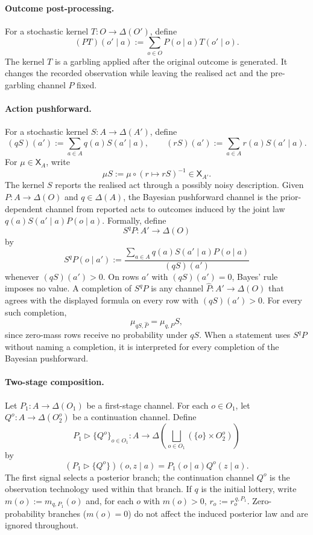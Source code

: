 \documentclass[11pt,a4paper]{article}
\theoremstyle{definition}
\newcommand{\1}{\mathbf 1}
\begin{document}
\paragraph{Outcome post-processing.}
For a stochastic kernel $T:O\to\Delta(O')$, define
\[
(PT)(o'\mid a):=\sum_{o\in O}P(o\mid a)T(o'\mid o).
\]
The kernel $T$ is a garbling applied after the original outcome is generated.  It changes the recorded observation while
leaving the realised act and the pre-garbling channel $P$ fixed.

\paragraph{Action pushforward.}
For a stochastic kernel $S:A\to\Delta(A')$, define
\[
(qS)(a'):=\sum_{a\in A}q(a)S(a'\mid a),
\qquad
(rS)(a'):=\sum_{a\in A}r(a)S(a'\mid a).
\]
For $\mu\in\mathsf X_A$, write
\[
\mu S:=\mu\circ(r\mapsto rS)^{-1}\in\mathsf X_{A'}.
\]
The kernel $S$ reports the realised act through a possibly noisy description.  Given $P:A\to\Delta(O)$ and
$q\in\Delta(A)$, the Bayesian pushforward channel is the prior-dependent channel from reported acts to outcomes induced by
the joint law $q(a)S(a'\mid a)P(o\mid a)$.  Formally, define
\[
S^qP:A'\to\Delta(O)
\]
by
\[
S^qP(o\mid a')
:=
\frac{\sum_{a\in A}q(a)S(a'\mid a)P(o\mid a)}{(qS)(a')}
\]
whenever $(qS)(a')>0$.  On rows $a'$ with $(qS)(a')=0$, Bayes' rule imposes no value.  A completion of
$S^qP$ is any channel $\widehat P:A'\to\Delta(O)$ that agrees with the displayed formula on every row with
$(qS)(a')>0$.  For every such completion,
\[
\mu_{qS,\widehat P}=\mu_{q,P}S,
\]
since zero-mass rows receive no probability under $qS$.  When a statement uses $S^qP$ without naming a completion, it is
interpreted for every completion of the Bayesian pushforward.

\paragraph{Two-stage composition.}
Let $P_1:A\to\Delta(O_1)$ be a first-stage channel.  For each $o\in O_1$, let
$Q^o:A\to\Delta(O_2^o)$ be a continuation channel.  Define
\[
P_1\triangleright\{Q^o\}_{o\in O_1}:
A\to\Delta\left(\bigsqcup_{o\in O_1}(\{o\}\times O_2^o)\right)
\]
by
\[
(P_1\triangleright\{Q^o\})(o,z\mid a)=P_1(o\mid a)Q^o(z\mid a).
\]
The first signal selects a posterior branch; the continuation channel $Q^o$ is the observation technology used within that
branch.
If $q$ is the initial lottery, write $m(o):=m_{q,P_1}(o)$ and, for each $o$ with $m(o)>0$,
$r_o:=r_o^{\,q,P_1}$.  Zero-probability branches ($m(o)=0$) do not affect the induced posterior law and are ignored
throughout.
\end{document}
